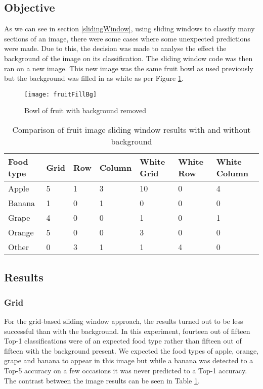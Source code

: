 \tocless\subsection{Objective}
As we can see in section \ref{slidingWindow}, using sliding windows to classify many sections
of an image, there were some cases where some unexpected predictions were made.
Due to this, the decision was made to analyse the effect the background of the
image on its classification. The sliding window code was then ran on a new
image. This new image was the same fruit bowl as used previously but the
background was filled in as white as per Figure \ref{fig:filledFruit}.

\begin{figure}[h]
\centering
    \texttt{[image: fruitFillBg]}
    \caption{Bowl of fruit with background removed}
    \label{fig:filledFruit}
\end{figure}

\begin{table}[h]
    \centering
    \caption{Comparison of fruit image sliding window results with and without
    background}
    \label{comparisionFruitTable}
    \begin{tabular}{|l|l|l|l|p{1.25cm}|p{1.25cm}|p{2cm}|}
    \hline
        \textbf{Food type} & \textbf{Grid} & \textbf{Row} & \textbf{Column} & \textbf{White Grid} & \textbf{White Row} & \textbf{White Column} \\ \hline
        Apple     & 5    & 1   & 3      & 10          & 0          & 4
        \\ \hline
        Banana    & 1    & 0   & 1      & 0           & 0          & 0
        \\ \hline
        Grape     & 4    & 0   & 0      & 1           & 0          & 1
        \\ \hline
        Orange    & 5    & 0   & 0      & 3           & 0          & 0
        \\ \hline
        Other     & 0    & 3   & 1      & 1           & 4          & 0  \\ \hline           
    \end{tabular}
\end{table}

\tocless\subsection{Results}
\tocless\subsubsection{Grid}
For the grid-based sliding window approach, the results turned out to be less
successful than with the background. In this experiment, fourteen out of fifteen Top-1 classifications were of an expected food type rather than fifteen out of
fifteen with the background present. We expected the food types of apple,
orange, grape and banana to appear in this image but while a banana was detected
to a Top-5 accuracy on a few occasions it was never predicted to a Top-1
accuracy. The contrast between the image results can be seen in Table
\ref{comparisionFruitTable}.

